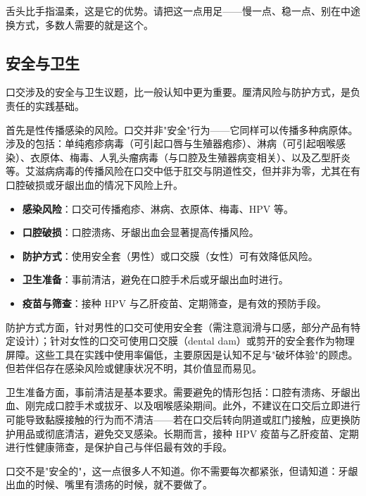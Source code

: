 \documentclass[12pt,UTF8]{ctexbook}
\newcommand{\keyword}[1]{\textbf{#1}}
\begin{document}
\begin{tcolorbox}[colback=pink!5!white,colframe=red!50!black,title=贴心小叮咛]
	舌头比手指温柔，这是它的优势。请把这一点用足——慢一点、稳一点、别在中途换方式，多数人需要的就是这个。
\end{tcolorbox}
\subsection{安全与卫生}

口交涉及的安全与卫生议题，比一般认知中更为重要。厘清风险与防护方式，是负责任的实践基础。

首先是性传播感染的风险。口交并非"安全"行为——它同样可以传播多种病原体。涉及的包括：单纯疱疹病毒（可引起口唇与生殖器疱疹）、淋病（可引起咽喉感染）、衣原体、梅毒、人乳头瘤病毒（与口腔及生殖器病变相关）、以及乙型肝炎等。艾滋病病毒的传播风险在口交中低于肛交与阴道性交，但并非为零，尤其在有口腔破损或牙龈出血的情况下风险上升。

\begin{itemize}
	\item \keyword{感染风险}：口交可传播疱疹、淋病、衣原体、梅毒、HPV 等。
	\item \keyword{口腔破损}：口腔溃疡、牙龈出血会显著提高传播风险。
	\item \keyword{防护方式}：使用安全套（男性）或口交膜（女性）可有效降低风险。
	\item \keyword{卫生准备}：事前清洁，避免在口腔手术后或牙龈出血时进行。
	\item \keyword{疫苗与筛查}：接种 HPV 与乙肝疫苗、定期筛查，是有效的预防手段。
\end{itemize}

防护方式方面，针对男性的口交可使用安全套（需注意润滑与口感，部分产品有特定设计）；针对女性的口交可使用口交膜（dental dam）或剪开的安全套作为物理屏障。这些工具在实践中使用率偏低，主要原因是认知不足与"破坏体验"的顾虑。但若伴侣存在感染风险或健康状况不明，其价值显而易见。

卫生准备方面，事前清洁是基本要求。需要避免的情形包括：口腔有溃疡、牙龈出血、刚完成口腔手术或拔牙、以及咽喉感染期间。此外，不建议在口交后立即进行可能导致黏膜接触的行为而不清洁——若在口交后转向阴道或肛门接触，应更换防护用品或彻底清洁，避免交叉感染。长期而言，接种 HPV 疫苗与乙肝疫苗、定期进行性健康筛查，是保护自己与伴侣最有效的手段。

\begin{tcolorbox}[colback=pink!5!white,colframe=red!50!black,title=贴心小叮咛]
	口交不是"安全的"，这一点很多人不知道。你不需要每次都紧张，但请知道：牙龈出血的时候、嘴里有溃疡的时候，就不要做了。
\end{tcolorbox}
\end{document}
